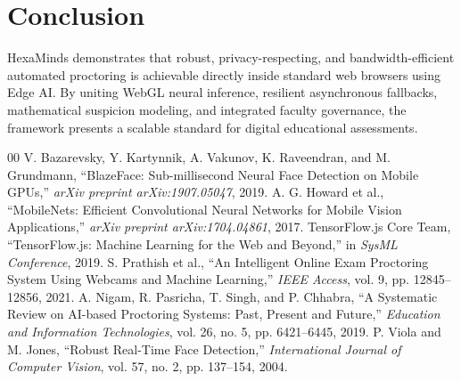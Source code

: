 \documentclass[conference]{IEEEtran}
\begin{document}
\section{Conclusion}
HexaMinds demonstrates that robust, privacy-respecting, and bandwidth-efficient automated proctoring is achievable directly inside standard web browsers using Edge AI. By uniting WebGL neural inference, resilient asynchronous fallbacks, mathematical suspicion modeling, and integrated faculty governance, the framework presents a scalable standard for digital educational assessments.

\begin{thebibliography}{00}
 V. Bazarevsky, Y. Kartynnik, A. Vakunov, K. Raveendran, and M. Grundmann, ``BlazeFace: Sub-millisecond Neural Face Detection on Mobile GPUs,'' \textit{arXiv preprint arXiv:1907.05047}, 2019.
 A. G. Howard et al., ``MobileNets: Efficient Convolutional Neural Networks for Mobile Vision Applications,'' \textit{arXiv preprint arXiv:1704.04861}, 2017.
 TensorFlow.js Core Team, ``TensorFlow.js: Machine Learning for the Web and Beyond,'' in \textit{SysML Conference}, 2019.
 S. Prathish et al., ``An Intelligent Online Exam Proctoring System Using Webcams and Machine Learning,'' \textit{IEEE Access}, vol. 9, pp. 12845--12856, 2021.
 A. Nigam, R. Pasricha, T. Singh, and P. Chhabra, ``A Systematic Review on AI-based Proctoring Systems: Past, Present and Future,'' \textit{Education and Information Technologies}, vol. 26, no. 5, pp. 6421--6445, 2019.
 P. Viola and M. Jones, ``Robust Real-Time Face Detection,'' \textit{International Journal of Computer Vision}, vol. 57, no. 2, pp. 137--154, 2004.
\end{thebibliography}
\end{document}
